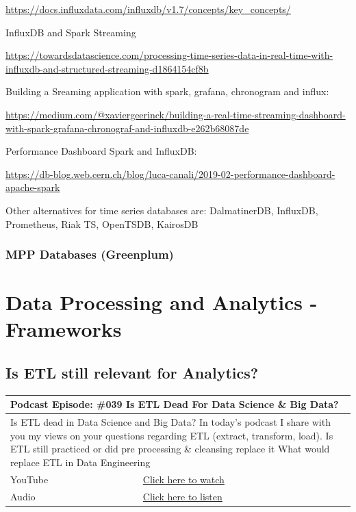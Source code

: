 \documentclass[12pt, numbers=noenddot]{scrreprt} %
\begin{document}
\url{https://docs.influxdata.com/influxdb/v1.7/concepts/key_concepts/}
 
InfluxDB and Spark Streaming

\url{https://towardsdatascience.com/processing-time-series-data-in-real-time-with-influxdb-and-structured-streaming-d1864154cf8b}
 
Building a Sreaming application with spark, grafana, chronogram and influx:

\url{https://medium.com/@xaviergeerinck/building-a-real-time-streaming-dashboard-with-spark-grafana-chronograf-and-influxdb-e262b68087de}
 
Performance Dashboard Spark and InfluxDB:

\url{https://db-blog.web.cern.ch/blog/luca-canali/2019-02-performance-dashboard-apache-spark}

Other alternatives for time series databases are: DalmatinerDB, InfluxDB, Prometheus, Riak TS, OpenTSDB, KairosDB
 

\subsection{MPP Databases (Greenplum)}


\chapter{Data Processing and Analytics - Frameworks}

\section{Is ETL still relevant for Analytics?}

\begin{table}[h]
\begin{tabular}{ll}
\hline
\multicolumn{2}{l}{\textbf{Podcast Episode:} \#039 Is ETL Dead For Data Science \& Big Data?} \\ \hline
\multicolumn{2}{p{15cm}}{Is ETL dead in Data Science and Big Data? In today's podcast I share with you my views on your questions regarding ETL (extract, transform, load). Is ETL still practiced or did pre processing \& cleansing replace it What would replace ETL in Data Engineering}         \\ \hline
\multicolumn{1}{l|}{YouTube}   & \href{https://youtu.be/leSOWPaNkl4}{Click here to watch}   \\ 
\multicolumn{1}{l|}{Audio}     & \href{https://anchor.fm/andreaskayy/episodes/Is-ETL-Dead-For-Data-Science--Big-Data---PoDS-039-e2b604}{Click here to listen}   \\ \hline
\end{tabular}
\end{table}
\end{document}
